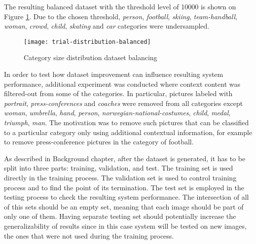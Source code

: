     The resulting balanced dataset with the threshold level of 10000 is shown on Figure \ref{fig:trial-distribution-balanced}. Due to the chosen threshold, \textit{person}, \textit{football}, \textit{skiing}, \textit{team-handball}, \textit{woman}, \textit{crowd}, \textit{child}, \textit{skating} and \textit{car} categories were undersampled.
    
    \begin{figure}[H]
        \centering
        \texttt{[image: trial-distribution-balanced]}
        \caption[Trial experiment. Category size distribution dataset balancing]{Category size distribution dataset balancing}
        \label{fig:trial-distribution-balanced}
    \end{figure}
    
    In order to test how dataset improvement can influence resulting system performance, additional experiment was conducted where context content was filtered-out from some of the categories. In particular, pictures labeled with \textit{portrait}, \textit{press-conferences} and \textit{coaches} were removed from all categories except \textit{woman}, \textit{umbrella}, \textit{hand}, \textit{person}, \textit{norwegian-national-costumes}, \textit{child}, \textit{medal}, \textit{triumph}, \textit{man}. The motivation was to remove such pictures that can be classified to a particular category only using additional contextual information, for example to remove press-conference pictures in the category of football.
    
    As described in Background chapter, after the dataset is generated, it has to be split into three parts: training, validation, and test. The training set is used directly in the training process. The validation set is used to control training process and to find the point of its termination. The test set is employed in the testing process to check the resulting system performance. The intersection of all of this sets should be an empty set, meaning that each image should be part of only one of them. Having separate testing set should potentially increase the generalizability of results since in this case system will be tested on new images, the ones that were not used during the training process. 
    
